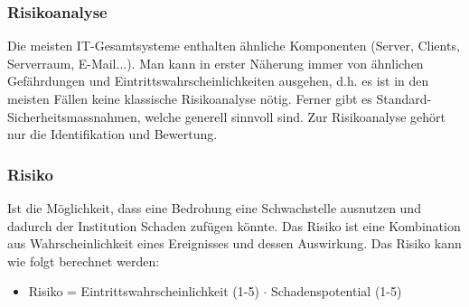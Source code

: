 \subsubsection{Risikoanalyse}
Die meisten IT-Gesamtsysteme enthalten ähnliche Komponenten (Server, Clients, Serverraum, E-Mail...). Man kann in erster Näherung immer von ähnlichen Gefährdungen und Eintrittswahrscheinlichkeiten ausgehen, d.h. es ist in den meisten Fällen keine klassische Risikoanalyse nötig. Ferner gibt es Standard-Sicherheitsmassnahmen, welche generell sinnvoll sind. Zur Risikoanalyse gehört nur die Identifikation und Bewertung.

\subsubsection{Risiko}
Ist die Möglichkeit, dass eine Bedrohung eine Schwachstelle
ausnutzen und dadurch der Institution Schaden zufügen könnte. Das Risiko ist eine Kombination aus Wahrscheinlichkeit eines Ereignisses und dessen Auswirkung. Das Risiko kann wie folgt berechnet werden:
\begin{itemize}
	\item Risiko = Eintrittswahrscheinlichkeit (1-5) $\cdot$ Schadenspotential (1-5)
\end{itemize}

